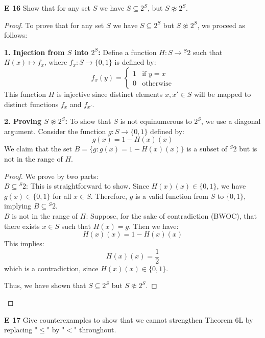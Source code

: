 \begin{question}
    \textbf{E 16}
    Show that for any set \(S\) we have \(S \subseteq 2^S\), but \(S \not\approx 2^S\).
\end{question}
\begin{proof}
    To prove that for any set \(S\) we have \(S \subseteq 2^S\) but \(S \not\approx 2^S\), we proceed as follows:

    \textbf{1. Injection from \(S\) into \(2^S\):}  
    Define a function \(H: S \rightarrow {}^S 2\) such that \(H(x) \mapsto f_x\), where \(f_x: S \rightarrow \{0, 1\}\) is defined by:
    \[
    f_x(y) = 
    \begin{cases} 
    1 & \text{if } y = x \\
    0 & \text{otherwise}
    \end{cases}
    \]
    This function \(H\) is injective since distinct elements \(x, x' \in S\) will be mapped to distinct functions \(f_x\) and \(f_{x'}\).

    \textbf{2. Proving \(S \not\approx 2^S\):}  
    To show that \(S\) is not equinumerous to \(2^S\), we use a diagonal argument. Consider the function \(g: S \rightarrow \{0, 1\}\) defined by:
    \[
    g(x) = 1 - H(x)(x)
    \]
    We claim that the set \(B = \{g: g(x) = 1 - H(x)(x)\}\) is a subset of \({}^S 2\) but is not in the range of \(H\).

    \begin{proof} We prove by two parts: \\
        \(B \subseteq {}^S 2\): This is straightforward to show. Since \(H(x)(x) \in \{0, 1\}\), we have \(g(x) \in \{0, 1\}\) for all \(x \in S\). Therefore, \(g\) is a valid function from \(S\) to \(\{0, 1\}\), implying \(B \subseteq {}^S 2\). \\
        \(B\) is not in the range of \(H\): Suppose, for the sake of contradiction (BWOC), that there exists \(x \in S\) such that \(H(x) = g\). Then we have:
        \[
        H(x)(x) = 1 - H(x)(x)
        \]
        This implies:
        \[
        H(x)(x) = \frac{1}{2}
        \]
        which is a contradiction, since \(H(x)(x) \in \{0, 1\}\).

        Thus, we have shown that \(S \subseteq 2^S\) but \(S \not\approx 2^S\).
    \end{proof}

\end{proof}
\begin{question}
    \textbf{E 17}
    Give counterexamples to show that we cannot strengthen Theorem 6L by replacing "\(\leq\)" by "\(<\)" throughout.
\end{question}
